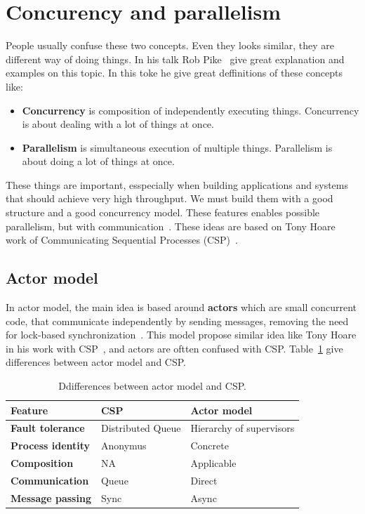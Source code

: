 \section{Concurency and parallelism}\label{sec:concurency_parallelism}
%
People usually confuse these two concepts. Even they looks similar, they are different way of doing things. In his talk Rob Pike~\cite{Pike} give great explanation and examples on this topic. In this toke he give great deffinitions of these concepts like:

\begin{itemize}
	\item \textbf{Concurrency} is composition of independently executing things. Concurrency is about dealing with a lot of things at once.
	\item \textbf{Parallelism} is simultaneous execution of multiple things. Parallelism is about doing a lot of things at once. 
\end{itemize}

These things are important, esspecially when building applications and systems that should achieve very high throughput. We must build them with a good structure and a good concurrency model. These features enables possible parallelism, but with communication~\cite{Pike}. These ideas are based on Tony Hoare work of Communicating Sequential Processes (CSP)~\cite{Hoare78}.

\subsection{Actor model}\label{sec:actor_model}
%
In actor model, the main idea is based around \textbf{actors} which are small concurrent code, that communicate independently by sending messages, removing the need for lock-based synchronization~\cite{Hewitt}. This model propose similar idea like Tony Hoare in his work with CSP~\cite{Hoare78}, and actors are oftten confused with CSP. Table~\ref{tab:table6} give differences between actor model and CSP.

\begin{table}[h!]
	\begin{center}
		\begin{tabular}{l|l|l}
			\textbf{Feature} & \textbf{CSP} & \textbf{Actor model}\\
			\hline
			\textbf{Fault tolerance} & Distributed Queue & Hierarchy of supervisors \\
			\textbf{Process identity} & Anonymus & Concrete \\
			\textbf{Composition} & NA & Applicable \\
			\textbf{Communication} & Queue & Direct \\
			\textbf{Message passing} & Sync & Async\\
		\end{tabular}
	\end{center}
	\vspace{-0.5cm}
	\caption{Ddifferences between actor model and CSP.}
	\label{tab:table6}
\end{table}

